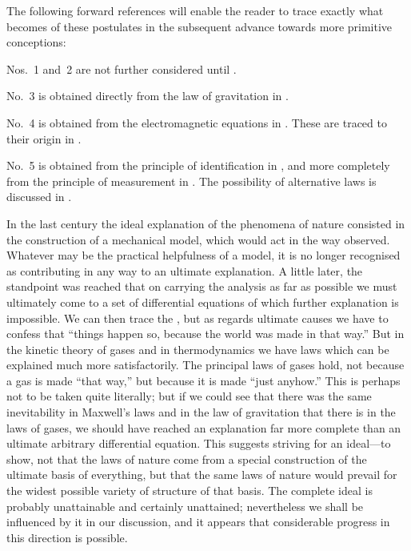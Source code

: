 \documentclass[12pt]{book}
\begin{document}
The following forward references will enable the reader to trace exactly
what becomes of these postulates in the subsequent advance towards more
primitive conceptions:

Nos.~1 and~2 are not further considered until .

No.~3 is obtained directly from the law of gravitation in .

No.~4 is obtained from the electromagnetic equations in . These are
traced to their origin in .

No.~5 is obtained from the principle of identification in , and more
completely from the principle of measurement in . The possibility of
alternative laws is discussed in .

In the last century the ideal explanation of the phenomena of nature consisted
%
in the construction of a mechanical model, which would act in the way
observed. Whatever may be the practical helpfulness of a model, it is no
longer recognised as contributing in any way to an ultimate explanation. A
little later, the standpoint was reached that on carrying the analysis as far as
possible we must ultimately come to a set of differential equations of which
further explanation is impossible. We can then trace the , but
as regards ultimate causes we have to confess that ``things happen so, because
the world was made in that way.'' But in the kinetic theory of gases and in
thermodynamics we have laws which can be explained much more satisfactorily.
The principal laws of gases hold, not because a gas is made ``that way,'' but
because it is made ``just anyhow.'' This is perhaps not to be taken quite
literally; but if we could see that there was the same inevitability in Maxwell's
laws and in the law of gravitation that there is in the laws of gases, we
should have reached an explanation far more complete than an ultimate arbitrary
differential equation. This suggests striving for an ideal---to show, not
that the laws of nature come from a special construction of the ultimate basis
of everything, but that the same laws of nature would prevail for the widest
possible variety of structure of that basis. The complete ideal is probably
unattainable and certainly unattained; nevertheless we shall be influenced
by it in our discussion, and it appears that considerable progress in this
direction is possible.

\end{document}
